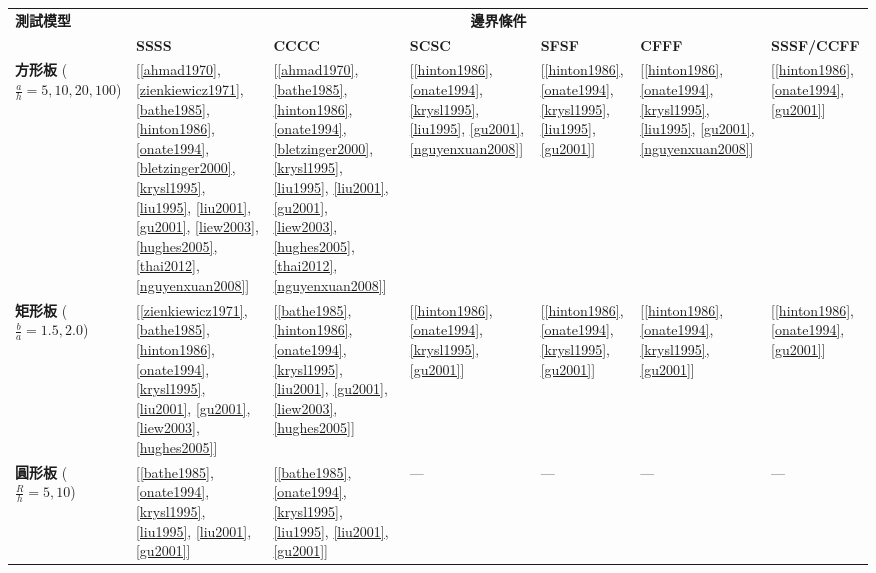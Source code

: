\documentclass[a4paper,10pt]{article}
\begin{document}
\clearpage
\thispagestyle{empty}
\begin{landscape}
\centering
\footnotesize
\setlength{\tabcolsep}{3pt}
\renewcommand{\arraystretch}{1.1}
\label{tab:cases}
\begin{tabular}{lp{2.8cm}p{2.8cm}p{2.6cm}p{2.4cm}p{2.4cm}p{2.4cm}}
\toprule
\multirow{2}{*}{\textbf{測試模型}} &
\multicolumn{6}{c}{\textbf{邊界條件}} \\
\cmidrule(lr){2-7}
 &
  \textbf{SSSS} &
  \textbf{CCCC} &
  \textbf{SCSC} &
  \textbf{SFSF} &
  \textbf{CFFF} &
  \textbf{SSSF/CCFF} \\
\midrule
\textbf{方形板} ($\frac{a}{h}=5,10,20,100$) &
  [\ref{ahmad1970}, \ref{zienkiewicz1971}, \ref{bathe1985}, \ref{hinton1986}, \ref{onate1994}, \ref{bletzinger2000}, \ref{krysl1995}, \ref{liu1995}, \ref{liu2001}, \ref{gu2001}, \ref{liew2003}, \ref{hughes2005}, \ref{thai2012}, \ref{nguyenxuan2008}] &
  [\ref{ahmad1970}, \ref{bathe1985}, \ref{hinton1986}, \ref{onate1994}, \ref{bletzinger2000}, \ref{krysl1995}, \ref{liu1995}, \ref{liu2001}, \ref{gu2001}, \ref{liew2003}, \ref{hughes2005}, \ref{thai2012}, \ref{nguyenxuan2008}] &
  [\ref{hinton1986}, \ref{onate1994}, \ref{krysl1995}, \ref{liu1995}, \ref{gu2001}, \ref{nguyenxuan2008}] &
  [\ref{hinton1986}, \ref{onate1994}, \ref{krysl1995}, \ref{liu1995}, \ref{gu2001}] &
  [\ref{hinton1986}, \ref{onate1994}, \ref{krysl1995}, \ref{liu1995}, \ref{gu2001}, \ref{nguyenxuan2008}] &
  [\ref{hinton1986}, \ref{onate1994}, \ref{gu2001}] \\
\midrule
\textbf{矩形板} ($\frac{b}{a}=1.5,2.0$) &
  [\ref{zienkiewicz1971}, \ref{bathe1985}, \ref{hinton1986}, \ref{onate1994}, \ref{krysl1995}, \ref{liu2001}, \ref{gu2001}, \ref{liew2003}, \ref{hughes2005}] &
  [\ref{bathe1985}, \ref{hinton1986}, \ref{onate1994}, \ref{krysl1995}, \ref{liu2001}, \ref{gu2001}, \ref{liew2003}, \ref{hughes2005}] &
  [\ref{hinton1986}, \ref{onate1994}, \ref{krysl1995}, \ref{gu2001}] &
  [\ref{hinton1986}, \ref{onate1994}, \ref{krysl1995}, \ref{gu2001}] &
  [\ref{hinton1986}, \ref{onate1994}, \ref{krysl1995}, \ref{gu2001}] &
  [\ref{hinton1986}, \ref{onate1994}, \ref{gu2001}] \\
\midrule
\textbf{圓形板} ($\frac{R}{h}=5,10$) &
  [\ref{bathe1985}, \ref{onate1994}, \ref{krysl1995}, \ref{liu1995}, \ref{liu2001}, \ref{gu2001}] &
  [\ref{bathe1985}, \ref{onate1994}, \ref{krysl1995}, \ref{liu1995}, \ref{liu2001}, \ref{gu2001}] &
  --- &
  --- &
  --- &
  --- \\

\end{tabular}
\end{landscape}
\end{document}

